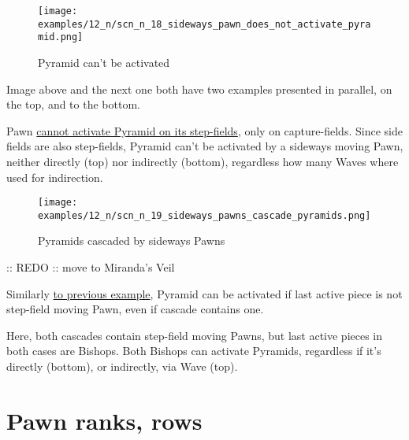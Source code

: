 \vspace*{-1.4\baselineskip}
\noindent
\begin{figure}[!h]
\texttt{[image: examples/12\_n/scn\_n\_18\_sideways\_pawn\_does\_not\_activate\_pyramid.png]}
\vspace*{-1.3\baselineskip}
\caption{Pyramid can't be activated}
\label{fig:scn_n_18_sideways_pawn_does_not_activate_pyramid}
\end{figure}

\vspace*{-0.3\baselineskip}
Image above and the next one both have two examples presented in parallel, on the
top, and to the bottom.

Pawn
\hyperref[fig:scn_mv_38_activating_pyramid_by_pawn]{cannot activate Pyramid on its step-fields},
only on capture-fields.
Since side fields are also step-fields, Pyramid can't be activated by a sideways
moving Pawn, neither directly (top) nor indirectly (bottom), regardless how many
Waves where used for indirection.

\clearpage %

\vspace*{-2.1\baselineskip}
\noindent
\begin{figure}[!h]
\texttt{[image: examples/12\_n/scn\_n\_19\_sideways\_pawns\_cascade\_pyramids.png]}
\caption{Pyramids cascaded by sideways Pawns}
\label{fig:scn_n_19_sideways_pawns_cascade_pyramids}
\end{figure}

\TODO :: REDO :: move to Miranda's Veil

Similarly
\hyperref[fig:scn_mv_39_activating_pyramid_cascade_pawn]{to previous example},
Pyramid can be activated if last active piece is not step-field moving Pawn, even
if cascade contains one.

Here, both cascades contain step-field moving Pawns, but last active pieces in both
cases are Bishops. Both Bishops can activate Pyramids, regardless if it's directly
(bottom), or indirectly, via Wave (top).

\clearpage %

\section*{Pawn ranks, rows}
\label{sec:Nineteen/Pawn ranks, rows}

